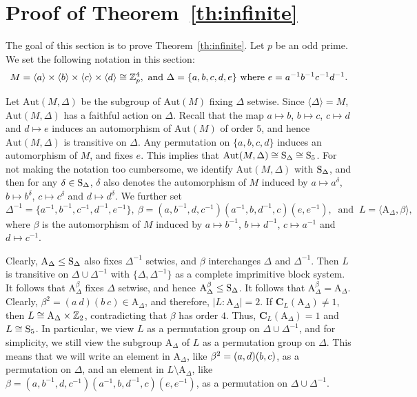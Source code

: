 \documentclass[12pt,reqno]{amsart}
\newcommand\A{\mathrm{A}} \newcommand\AGL{\mathrm{AGL}} \newcommand\AGammaL{\mathrm{A\Gamma L}} \newcommand\Alt{\mathrm{Alt}} \newcommand\ASL{\mathrm{ASL}} \newcommand\ASigmaL{\mathrm{A \Sigma L}} \newcommand\Aut{\mathrm{Aut}}
\def\C{\mathbf{C}}   \newcommand\Cay{\mathrm{Cay}}   \newcommand\Cos{\mathrm{Cos}} \newcommand{\CGammaSp}{\mathrm{C\Gamma Sp}}
\numberwithin {equation} {section}
\begin{document}
\section{Proof of Theorem~\ref{th:infinite}}\label{sec:6p4}

The goal of this section is to prove Theorem~\ref{th:infinite}. Let $p$ be an odd prime. We set the following  notation in this section:
\[M=\langle a\rangle\times \langle b\rangle\times\langle c\rangle\times\langle d \rangle\cong \mathbb{Z}_p^4, \mbox{ and } \Delta=\{a,b,c,d,e\} \mbox{ where } e=a^{-1}b^{-1}c^{-1}d^{-1}.\]

Let $\Aut(M,\Delta)$ be the subgroup of $\Aut(M)$ fixing $\Delta$ setwise. Since $\langle \Delta\rangle=M$, $\Aut(M,\Delta)$ has a faithful action on $\Delta$. Recall that the map  $a\mapsto b$, $b\mapsto c$, $c\mapsto d$ and $d\mapsto e$ induces an automorphism of $\Aut(M)$ of order $5$, and hence $\Aut(M,\Delta)$ is transitive on $\Delta$. Any permutation on $\{a,b,c,d\}$ induces an automorphism of $M$, and fixes $e$. This implies that $\Aut(M,\Delta)\cong \Sy_\Delta\cong\Sy_5$.  For not making the notation too cumbersome, we identify $\Aut(M,\Delta)$ with $\mathrm{S}_{\Delta}$, and then for any $\delta\in \mathrm{S}_{\Delta}$, $\delta$ also denotes the automorphism of $M$ induced by $a\mapsto a^\delta$, $b\mapsto b^\delta$, $c\mapsto c^\delta$ and $d\mapsto d^\delta$.  We further set
\[\Delta^{-1}=\{a^{-1},b^{-1},c^{-1},d^{-1},e^{-1}\}, \ \beta=(a,b^{-1},d,c^{-1})(a^{-1},b,d^{-1},c)(e,e^{-1}),   \ \text{ and }  \ L=\langle \A_\Delta,\beta\rangle,\]
where $\beta$ is the automorphism of $M$ induced by $a\mapsto b^{-1}$, $b\mapsto d^{-1}$, $c\mapsto a^{-1}$ and $d\mapsto c^{-1}$.

Clearly, $\A_{\Delta}\leq \Sy_\Delta$ also fixes $\Delta^{-1}$ setwies, and $\beta$ interchanges $\Delta$ and $\Delta^{-1}$. Then $L$ is transitive on $\Delta\cup \Delta^{-1}$ with $\{\Delta,\Delta^{-1}\}$ as a complete imprimitive block system. It follows that $\A_\Delta^\beta$ fixes $\Delta$ setwise, and hence  $\A_\Delta^\beta\leq \Sy_\Delta$. It follows that $\A_\Delta^\beta=\A_\Delta$. Clearly, $\beta^2=(a\ d)(b\ c)\in \A_\Delta$, and therefore, $|L:\A_\Delta|=2$. If $\C_L(\A_\Delta)\not=1$, then $L\cong \A_{\Delta}\times\ZZ_2$,
contradicting that $\beta$ has order $4$. Thus, $\C_L(\A_\Delta)=1$ and $L\cong\mathrm{S}_5$. In particular, we view $L$ as a permutation group on $\Delta\cup\Delta^{-1}$, and for simplicity, we still view the subgroup $\A_{\Delta}$ of $L$ as a permutation group on $\Delta$. This means that we will write an element in $\A_{\Delta}$, like $\beta^2=(a,d)(b,c)$,  as a permutation on $\Delta$, and an element
in $L \setminus \A_{\Delta}$, like $\beta=(a,b^{-1},d,c^{-1})(a^{-1},b,d^{-1},c)(e,e^{-1})$, as a permutation on $\Delta\cup\Delta^{-1}$.
\end{document}
